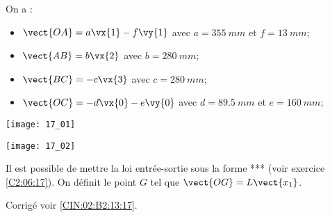 \normalfalse \difficilefalse \tdifficiletrue
\correctionfalse


\setcounter{question}{0}%
\ifcorrection
\else
{}
\fi

\ifprof
\else
On a : 
\begin{itemize}
\item $\vect{OA} = a \vx{1}-f \vy{1}$ avec $a=\SI{355}{mm}$ et $f=\SI{13}{mm}$;
\item $\vect{AB} = b \vx{2}$ avec $b=\SI{280}{mm}$;
\item $\vect{BC} = -c \vx{3}$ avec $c=\SI{280}{mm}$;
\item $\vect{OC} = -d \vx{0}-e\vy{0}$ avec $d=\SI{89,5}{mm}$ et $e=\SI{160}{mm}$;
\end{itemize}

\begin{marginfigure}
\texttt{[image: 17\_01]}

\texttt{[image: 17\_02]}
\end{marginfigure}
\fi
Il est possible de mettre la loi entrée-sortie sous la forme *** (voir exercice \ref{C2:06:17}).
On définit le point $G$ tel que $\vect{OG}=L\vect{x_1}$.

\ifprof
\else
\fi

\ifprof
\else
\fi

\ifprof
\else
\begin{flushright}
\footnotesize{Corrigé  voir \ref{CIN:02:B2:13:17}.}
\end{flushright}%
\fi